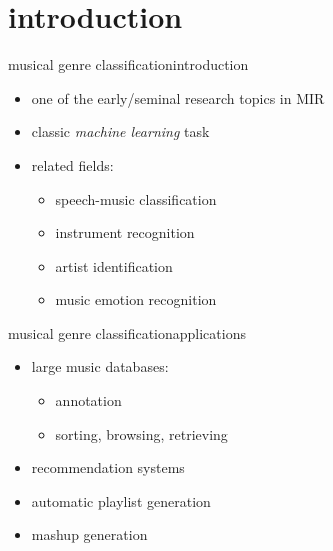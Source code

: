     \section[intro]{introduction}
        \begin{frame}{musical genre classification}{introduction}
            \begin{itemize}
                \item	one of the early/seminal research topics in MIR
                \item<2->	classic \textit{machine learning }task
                \item<3->	related fields:
                    \begin{itemize}
                        \item	speech-music classification
                        \item	instrument recognition
                        \item   artist identification
                        \item   music emotion recognition
                    \end{itemize}
            \end{itemize}
        \end{frame}

        \begin{frame}{musical genre classification}{applications}
            \begin{itemize}
                \item	large music databases:
                    \begin{itemize}
                        \item	annotation
                        \item	sorting, browsing, retrieving
                    \end{itemize}
                \item recommendation systems
                \item	automatic playlist generation
                \item	mashup generation
            \end{itemize}
        \end{frame}

